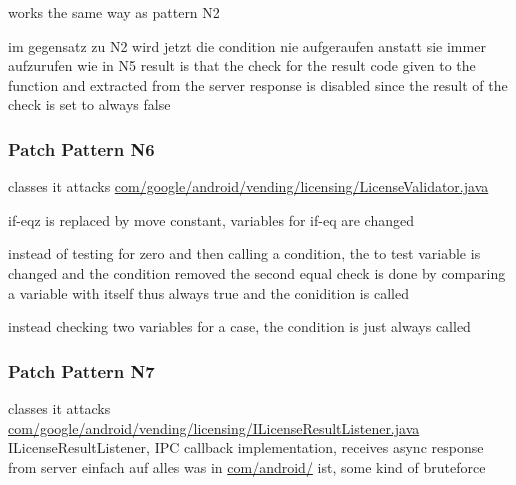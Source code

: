 works the same way as pattern N2

im gegensatz zu N2 wird jetzt die condition nie aufgeraufen anstatt sie immer aufzurufen wie in N5
result is that the check for the result code given to the function and extracted from the server response is disabled since the result of the check is set to always false
\subsubsection{Patch Pattern N6}
classes it attacks %
\url{com/google/android/vending/licensing/LicenseValidator.java}



if-eqz is replaced by move constant, variables for if-eq are changed



instead of testing for zero and then calling a condition, the to test variable is changed and the condition removed
the second equal check is done by comparing a variable with itself thus always true and the conidition is called



instead checking two variables for a case, the condition is just always called
\subsubsection{Patch Pattern N7}
classes it attacks %
\url{com/google/android/vending/licensing/ILicenseResultListener.java}
ILicenseResultListener, IPC callback implementation, receives async response from server\cite{developersLicensingReference}
einfach auf alles was in \url{com/android/} ist, some kind of bruteforce

